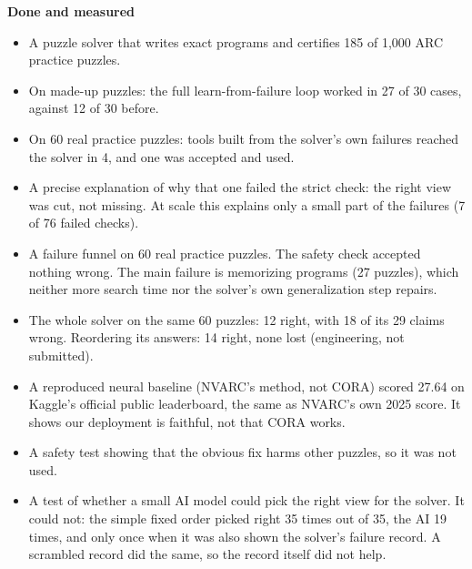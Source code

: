 \documentclass[11pt]{article}
\begin{document}
\textbf{Done and measured}
\begin{itemize}
  \item A puzzle solver that writes exact programs and certifies 185 of 1,000 ARC practice puzzles.
  \item On made-up puzzles: the full learn-from-failure loop worked in 27 of 30 cases, against 12 of 30
    before.
  \item On 60 real practice puzzles: tools built from the solver's own failures reached the solver in 4,
    and one was accepted and used.
  \item A precise explanation of why that one failed the strict check: the right view was cut, not missing.
    At scale this explains only a small part of the failures (7 of 76 failed checks).
  \item A failure funnel on 60 real practice puzzles. The safety check accepted nothing wrong. The main
    failure is memorizing programs (27 puzzles), which neither more search time nor the solver's own
    generalization step repairs.
  \item The whole solver on the same 60 puzzles: 12 right, with 18 of its 29 claims wrong. Reordering its
    answers: 14 right, none lost (engineering, not submitted).
  \item A reproduced neural baseline (NVARC's method, not CORA) scored 27.64 on Kaggle's official public
    leaderboard, the same as NVARC's own 2025 score. It shows our deployment is faithful, not that CORA works.
  \item A safety test showing that the obvious fix harms other puzzles, so it was not used.
  \item A test of whether a small AI model could pick the right view for the solver. It could not: the
    simple fixed order picked right 35 times out of 35, the AI 19 times, and only once when it was also
    shown the solver's failure record. A scrambled record did the same, so the record itself did not help.
\end{itemize}
\end{document}
